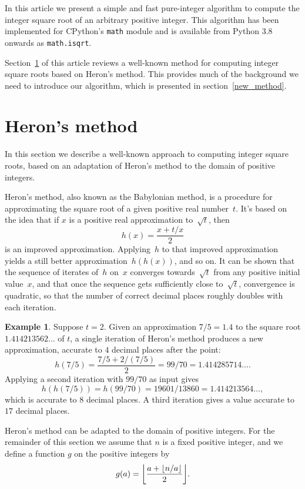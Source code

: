 \documentclass[a4paper]{article}
\DeclarePairedDelimiter\floor{\lfloor}{\rfloor}
\theoremstyle{plain}
\theoremstyle{definition}
\newtheorem{example}[theorem]{Example}
\begin{document}
In this article we present a simple and fast pure-integer algorithm to compute
the integer square root of an arbitrary positive integer. This algorithm has
been implemented for CPython's \lstinline{math} module and is available from
Python 3.8 onwards as \lstinline{math.isqrt}.

Section~\ref{old_method} of this article reviews a well-known method for
computing integer square roots based on Heron's method. This provides much of
the background we need to introduce our algorithm, which is presented in
section~\ref{new_method}.

\section{Heron's method}
\label{old_method}

In this section we describe a well-known approach to computing integer square
roots, based on an adaptation of Heron's method to the domain of positive
integers.

Heron's method, also known as the Babylonian method, is a procedure for
approximating the square root of a given positive real number~$t$. It's based
on the idea that if $x$ is a positive real approximation to~$\sqrt t$, then
$$h(x) = \frac{x + t/x}2$$ is an improved approximation. Applying~$h$ to that
improved approximation yields a still better approximation~$h(h(x))$, and so
on. It can be shown that the sequence of iterates of~$h$ on~$x$ converges
towards~$\sqrt t$ from any positive initial value~$x$, and that once the
sequence gets sufficiently close to~$\sqrt t$, convergence is
quadratic, so that the number of correct decimal places roughly doubles with
each iteration.

\begin{example}
  Suppose $t=2$. Given an approximation $7/5 = 1.4$ to the square root
  $1.414213562\dots$ of $t$, a single iteration of Heron's method produces a
  new approximation, accurate to $4$ decimal places after the point:
  $$h(7/5) = \frac{7/5 + 2/(7/5)}2 = 99/70 = 1.414285714\dots.$$ Applying a
  second iteration with $99/70$ as input gives
  $$h(h(7/5)) = h(99/70) = 19601/13860 =
  1.414213564\dots,$$ which is accurate to $8$ decimal places. A third
  iteration gives a value accurate to $17$ decimal places.
\end{example}

Heron's method can be adapted to the domain of positive integers. For the
remainder of this section we assume that $n$ is a fixed positive integer, and
we define a function $g$ on the positive integers by
$$g(a) = \floor*{\frac{a + \floor{n/a}}2}.$$
\end{document}
